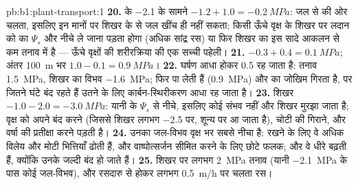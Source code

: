 \begin{solution}{pb:b1:plant-transport:1}
\textbf{20.}  के \qty{-2.1}{} के सामने $-1.2 + 1.0 = \qty{-0.2}{MPa}$:
जल  से  की ओर चलता, इसलिए इन मानों पर 
शिखर के  से जल खींच ही नहीं सकता; किसी ऊँचे वृक्ष के शिखर पर लदान
को  का $\Psi_s$ और नीचे ले जाना पड़ता होगा (अधिक सांद्र रस) या फिर
शिखर का  इस सादे आकलन से कम तनाव में है --- ऊँचे वृक्षों की
शरीरक्रिया की एक सच्ची पहेली।
\textbf{21.} $-0.3 + 0.4 = \qty{0.1}{MPa}$; अंतर \qty{100}{m} भर
$1.0 - 0.1 =
\qty{0.9}{MPa}$।
\textbf{22.} घर्षण आधा होकर \qty{0.5}{} रह जाता है: तनाव \qty{1.5}{MPa},
शिखर का विभव \qty{-1.6}{MPa};   फिर पा लेती हैं
(\qty{0.9}{MPa}) और  का जोखिम गिरता है, पर जितने घंटे  बंद
रहते हैं उतने के लिए कार्बन-स्थिरीकरण आधा रह जाता है।
\textbf{23.} शिखर $-1.0 - 2.0 = \qty{-3.0}{MPa}$: यानी  के
$\Psi_s$ से नीचे, इसलिए कोई  संभव नहीं और शिखर मुरझा जाता है;
वृक्ष को अपने  बंद करने (जिससे शिखर लगभग \qty{-2.5}{} पर, शून्य
 पर आ जाता है), चोटी की  गिराने, और वर्षा की प्रतीक्षा
करने पड़ती है।
\textbf{24.} उनका जल-विभव वृक्ष भर सबसे नीचा है:  रखने के
लिए वे अधिक विलेय और मोटी भित्तियाँ ढोती हैं, और वाष्पोत्सर्जन सीमित करने
के लिए छोटे फलक; और वे धीरे बढ़ती हैं, क्योंकि उनके 
जल्दी बंद हो जाते हैं।
\textbf{25.} शिखर पर लगभग \qty{2}{MPa} तनाव (यानी \qty{-2.1}{MPa} के
पास कोई जल-विभव), और रसदारु से होकर लगभग \qty{0.5}{m/h} पर चलता रस।
\end{solution}
